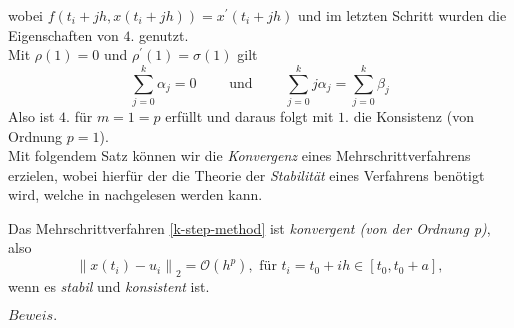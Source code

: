 wobei $f(t_i+jh,x(t_i+jh)) = x^{\prime}(t_i+jh)$ und im letzten Schritt wurden die Eigenschaften von $4.$ genutzt.\\
Mit $\rho(1) = 0$ und $\rho^{\prime}(1)=\sigma(1)$ gilt
\[
    \sum_{j=0}^{k} \alpha_j = 0 \qquad \text{ und } \qquad \sum_{j=0}^{k} j \alpha_j = \sum_{j=0}^{k} \beta_j
\]
Also ist $4.$ für $m=1=p$ erfüllt und daraus folgt mit $1.$ die Konsistenz (von Ordnung $p=1$). \qedwhite \\
Mit folgendem Satz können wir die \textit{Konvergenz} eines Mehrschrittverfahrens erzielen, wobei hierfür der die
Theorie der \textit{Stabilität} eines Verfahrens benötigt wird, welche in
\cite[80]{ernsthairergerhardwannerSolvingOrdinaryDifferential} nachgelesen werden kann.
\begin{satz}
    Das Mehrschrittverfahren \eqref{k-step-method} ist {\em konvergent (von der Ordnung p)}, also
    \[
        \left\lVert x(t_i) - u_i \right\rVert_2 = \mathcal{O}(h^p), \text{ für } t_i=t_0+ih \in [t_0,t_0+a],
    \]
    wenn es {\em stabil} und {\em konsistent} ist.
\end{satz}
$Beweis.$ \cite[392-393]{ernsthairergerhardwannerSolvingOrdinaryDifferential}
